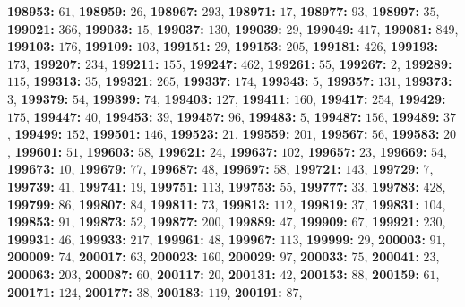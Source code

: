 \textsf{\bfseries 198953:} $61$, \textsf{\bfseries 198959:} $26$, \textsf{\bfseries 198967:} $293$, \textsf{\bfseries 198971:} $17$, \textsf{\bfseries 198977:} $93$, \textsf{\bfseries 198997:} $35$, \textsf{\bfseries 199021:} $366$, \textsf{\bfseries 199033:} $15$, \textsf{\bfseries 199037:} $130$, \textsf{\bfseries 199039:} $29$, \textsf{\bfseries 199049:} $417$, \textsf{\bfseries 199081:} $849$, \textsf{\bfseries 199103:} $176$, \textsf{\bfseries 199109:} $103$, \textsf{\bfseries 199151:} $29$, \textsf{\bfseries 199153:} $205$, \textsf{\bfseries 199181:} $426$, \textsf{\bfseries 199193:} $173$, \textsf{\bfseries 199207:} $234$, \textsf{\bfseries 199211:} $155$, \textsf{\bfseries 199247:} $462$, \textsf{\bfseries 199261:} $55$, \textsf{\bfseries 199267:} $2$, \textsf{\bfseries 199289:} $115$, \textsf{\bfseries 199313:} $35$, \textsf{\bfseries 199321:} $265$, \textsf{\bfseries 199337:} $174$, \textsf{\bfseries 199343:} $5$, \textsf{\bfseries 199357:} $131$, \textsf{\bfseries 199373:} $3$, \textsf{\bfseries 199379:} $54$, \textsf{\bfseries 199399:} $74$, \textsf{\bfseries 199403:} $127$, \textsf{\bfseries 199411:} $160$, \textsf{\bfseries 199417:} $254$, \textsf{\bfseries 199429:} $175$, \textsf{\bfseries 199447:} $40$, \textsf{\bfseries 199453:} $39$, \textsf{\bfseries 199457:} $96$, \textsf{\bfseries 199483:} $5$, \textsf{\bfseries 199487:} $156$, \textsf{\bfseries 199489:} $37$, \textsf{\bfseries 199499:} $152$, \textsf{\bfseries 199501:} $146$, \textsf{\bfseries 199523:} $21$, \textsf{\bfseries 199559:} $201$, \textsf{\bfseries 199567:} $56$, \textsf{\bfseries 199583:} $20$, \textsf{\bfseries 199601:} $51$, \textsf{\bfseries 199603:} $58$, \textsf{\bfseries 199621:} $24$, \textsf{\bfseries 199637:} $102$, \textsf{\bfseries 199657:} $23$, \textsf{\bfseries 199669:} $54$, \textsf{\bfseries 199673:} $10$, \textsf{\bfseries 199679:} $77$, \textsf{\bfseries 199687:} $48$, \textsf{\bfseries 199697:} $58$, \textsf{\bfseries 199721:} $143$, \textsf{\bfseries 199729:} $7$, \textsf{\bfseries 199739:} $41$, \textsf{\bfseries 199741:} $19$, \textsf{\bfseries 199751:} $113$, \textsf{\bfseries 199753:} $55$, \textsf{\bfseries 199777:} $33$, \textsf{\bfseries 199783:} $428$, \textsf{\bfseries 199799:} $86$, \textsf{\bfseries 199807:} $84$, \textsf{\bfseries 199811:} $73$, \textsf{\bfseries 199813:} $112$, \textsf{\bfseries 199819:} $37$, \textsf{\bfseries 199831:} $104$, \textsf{\bfseries 199853:} $91$, \textsf{\bfseries 199873:} $52$, \textsf{\bfseries 199877:} $200$, \textsf{\bfseries 199889:} $47$, \textsf{\bfseries 199909:} $67$, \textsf{\bfseries 199921:} $230$, \textsf{\bfseries 199931:} $46$, \textsf{\bfseries 199933:} $217$, \textsf{\bfseries 199961:} $48$, \textsf{\bfseries 199967:} $113$, \textsf{\bfseries 199999:} $29$, \textsf{\bfseries 200003:} $91$, \textsf{\bfseries 200009:} $74$, \textsf{\bfseries 200017:} $63$, \textsf{\bfseries 200023:} $160$, \textsf{\bfseries 200029:} $97$, \textsf{\bfseries 200033:} $75$, \textsf{\bfseries 200041:} $23$, \textsf{\bfseries 200063:} $203$, \textsf{\bfseries 200087:} $60$, \textsf{\bfseries 200117:} $20$, \textsf{\bfseries 200131:} $42$, \textsf{\bfseries 200153:} $88$, \textsf{\bfseries 200159:} $61$, \textsf{\bfseries 200171:} $124$, \textsf{\bfseries 200177:} $38$, \textsf{\bfseries 200183:} $119$, \textsf{\bfseries 200191:} $87$, 

